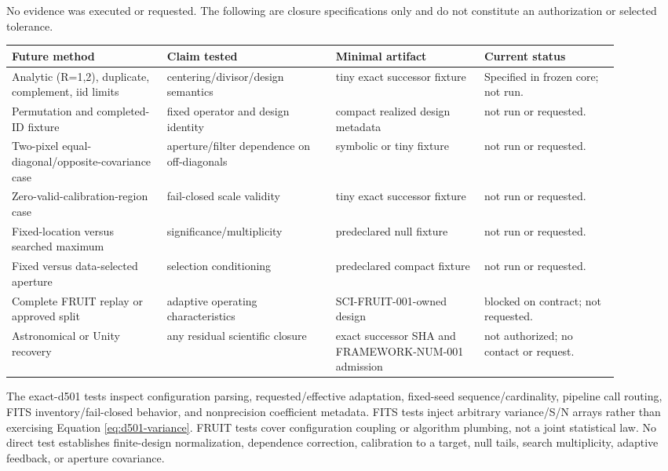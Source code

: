 \documentclass[11pt]{article}
\begin{document}
No evidence was executed or requested.  The following are closure
specifications only and do not constitute an authorization or selected
tolerance.

\begin{longtable}{L{0.23\linewidth}L{0.25\linewidth}L{0.22\linewidth}L{0.20\linewidth}}
\toprule
Future method & Claim tested & Minimal artifact & Current status\\
\midrule
Analytic (R=1,2), duplicate, complement, iid limits &
centering/divisor/design semantics & tiny exact successor fixture &
Specified in frozen core; not run.\\
Permutation and completed-ID fixture & fixed operator and design identity &
compact realized design metadata & not run or requested.\\
Two-pixel equal-diagonal/opposite-covariance case &
aperture/filter dependence on off-diagonals & symbolic or tiny fixture &
not run or requested.\\
Zero-valid-calibration-region case & fail-closed scale validity &
tiny exact successor fixture & not run or requested.\\
Fixed-location versus searched maximum & significance/multiplicity &
predeclared null fixture & not run or requested.\\
Fixed versus data-selected aperture & selection conditioning &
predeclared compact fixture & not run or requested.\\
Complete FRUIT replay or approved split & adaptive operating characteristics &
SCI-FRUIT-001-owned design & blocked on contract; not requested.\\
Astronomical or Unity recovery & any residual scientific closure &
exact successor SHA and FRAMEWORK-NUM-001 admission &
not authorized; no contact or request.\\
\bottomrule
\end{longtable}

The exact-d501 tests inspect configuration parsing, requested/effective
adaptation, fixed-seed sequence/cardinality, pipeline call routing, FITS
inventory/fail-closed behavior, and nonprecision coefficient metadata.  FITS
tests inject arbitrary variance/S/N arrays rather than exercising Equation
\eqref{eq:d501-variance}.  FRUIT tests cover configuration coupling or
algorithm plumbing, not a joint statistical law.  No direct test establishes
finite-design normalization, dependence correction, calibration to a target,
null tails, search multiplicity, adaptive feedback, or aperture covariance.
\end{document}
